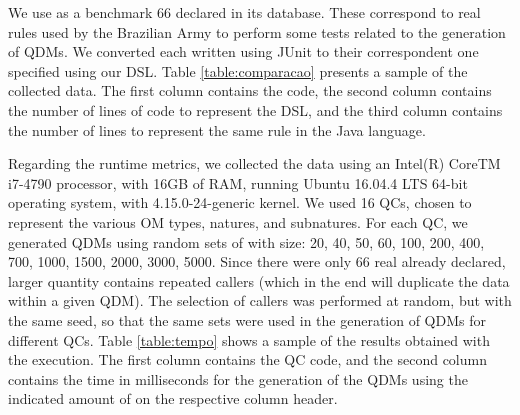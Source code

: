 We use as a benchmark 66 \callers declared in its database. These \callers correspond to real rules used by 
the Brazilian Army to perform some tests related to the generation of QDMs. We converted  
each \shc written using JUnit to their correspondent one specified using our DSL. 
Table \ref{table:comparacao} presents a sample of the collected data. The first column contains 
the \shc code, the second column contains the number of lines of code to represent the \shc DSL, and the third 
column contains the number of lines to represent the same rule in the Java language.


Regarding the runtime metrics, we collected the data using an Intel(R) Core{TM} i7-4790 processor, 
with 16GB of RAM, running Ubuntu 16.04.4 LTS 64-bit operating system, with 4.15.0-24-generic kernel. We used 16 QCs, 
chosen to represent the various OM types, natures, and subnatures. For each QC, we generated QDMs using 
random sets of \callers with size: 20, 40, 50, 60, 100, 200, 400, 700, 1000, 1500, 2000, 3000, 5000. 
Since there were only 66 real \callers already declared, larger quantity contains repeated callers (which in the end will duplicate 
the data within a given QDM). The selection of callers was performed at random, but with the same seed, so that the same sets were used in the 
generation of QDMs for different QCs. Table \ref{table:tempo} shows a sample of the results obtained with the execution. 
The first column contains the QC code, and the second column contains the time in milliseconds for the generation of 
the QDMs using the indicated amount of \callers on the respective column header.

